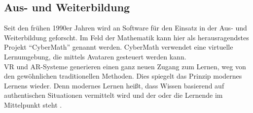 \documentclass[deutsch]{llncs}
\begin{document}
\subsection{Aus- und Weiterbildung}
Seit den frühen 1990er Jahren wird an Software für den Einsatz in der Aus- und Weiterbildung geforscht. Im Feld der Mathematik kann hier als herausragendstes Projekt ``CyberMath'' genannt werden. CyberMath verwendet eine virtuelle Lernumgebung, die mittels Avataren gesteuert werden kann. \\
VR und AR-Systeme generieren einen ganz neuen Zugang zum Lernen, weg von den gewöhnlichen traditionellen Methoden. Dies spiegelt das Prinzip modernes Lernens wieder. Denn modernes Lernen heißt, dass Wissen basierend auf authentischen Situationen vermittelt wird und der oder die Lernende im Mittelpunkt steht \cite{Klampfer,unknown}.
\end{document}
